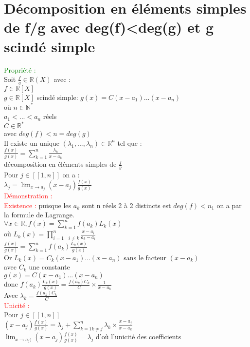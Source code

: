 \documentclass{article}
\begin{document}
	\section{Décomposition en éléments simples de f/g avec deg(f)<deg(g) et g scindé simple}
	\textcolor{green}{Propriété :} \\
	Soit $\frac{f}{g} \in \mathbb{R}(X)$ avec : \\
	$f \in \mathbb{R}[X]$ \\
	$g \in \mathbb{R}[X]$ scindé simple: $g(x)=C (x-a_1)...(x-a_n)$ \\
	où $n \in \mathbb{N}^*$ \\
	$a_1<...<a_n$ réels \\
	$C \in \mathbb{R}^*$ \\
	avec $deg(f)<n=deg(g)$ \\
	Il existe un unique $(\lambda_1, ... , \lambda_n)\in \mathbb{R}^n$ tel que : \\
	$\frac{f(x)}{g(x)}= \sum_{k=1}^n \frac{\lambda_k}{x-a_k}$ \\
	décomposition en éléments simples de $\frac{f}{g}$ \\
	Pour $j \in [[1,n]]$ on a : \\
	\indent $\lambda_j = \lim_{x \rightarrow a_j} (x-a_j) \frac{f(x)}{g(x)}$ \\
	\textcolor{red}{Démonstration :} \\
	\textcolor{red}{Existence :} puisque les $a_k$ sont n réels 2 à 2 distincts est $deg(f)<n_1$ on a par la formule de Lagrange.
 \\
 $\forall x \in \mathbb{R}, f(x)= \sum_{k=1}^n f(a_k) L_k(x)$ \\
 où $L_k(x)=\prod^n_{i=1 \quad i \neq k} \frac{x-a_i}{a_k-a_i}$ \\
 $\frac{f(x)}{g(x)}=\sum_{k=1}^n f(a_k) \frac{L_k(x)}{g(x)}$ \\
 Or $L_k(x)= C_k(x-a_1)...(x-a_n)$ sans le facteur  $(x-a_k)$\\ 
 avec $C_k$ une constante \\
 $g(x)= C (x-a_1)...(x-a_n)$ \\
 donc $f(a_k) \frac{L_k(x)}{g(x)}= \frac{f(a_k)C_k}{C} \times \frac{1}{x-a_k}$ \\
 Avec $ \lambda_k=\frac{f(a_k) C_k}{C}$ \\
 \textcolor{red}{Unicité :} \\
 Pour $ j \in [[1,n]]$ \\
 $(x-a_j)\frac{f(x)}{g(x)}= \lambda_j + \sum_{k=1 k \neq j}^n \lambda_k \times \frac{x-a_j}{x-a_k}$ \\
 $\lim_{x \rightarrow a_j)} (x-a_j) \frac{f(x)}{g(x)}= \lambda_j$ d'où l'unicité des coefficients
\end{document}
